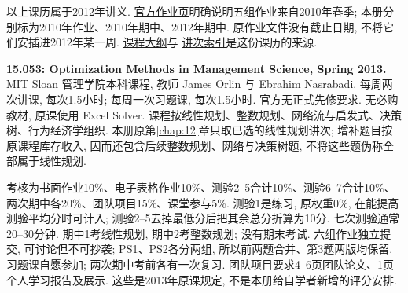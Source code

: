 以上课历属于2012年讲义. \href{https://ocw.mit.edu/courses/6-253-convex-analysis-and-optimization-spring-2012/pages/assignments/}{官方作业页}明确说明五组作业来自2010年春季;
本册分别标为2010年作业、2010年期中、2012年期中. 原作业文件没有截止日期, 不将它们安插进2012年某一周.
\href{https://ocw.mit.edu/courses/6-253-convex-analysis-and-optimization-spring-2012/pages/syllabus/}{课程大纲}与
\href{https://ocw.mit.edu/courses/6-253-convex-analysis-and-optimization-spring-2012/pages/lecture-notes/}{讲次索引}是这份课历的来源.

\clearpage
\noindent\textbf{15.053: Optimization Methods in Management Science, Spring 2013.}
MIT Sloan 管理学院本科课程, 教师 James Orlin 与 Ebrahim Nasrabadi.
每周两次讲课, 每次1.5小时; 每周一次习题课, 每次1.5小时. 官方无正式先修要求.
无必购教材, 原课使用 Excel Solver. 课程按线性规划、整数规划、网络流与启发式、决策树、行为经济学组织.
本册原第\ref{chap:12}章只取已选的线性规划讲次; 增补题目按原课程库存收入, 因而还包含后续整数规划、网络与决策树题, 不将这些题伪称全部属于线性规划.

考核为书面作业10\%、电子表格作业10\%、测验2--5合计10\%、测验6--7合计10\%、两次期中各20\%、团队项目15\%、课堂参与5\%.
测验1是练习, 原权重0\%, 在能提高测验平均分时可计入; 测验2--5去掉最低分后把其余总分折算为10分.
七次测验通常20--30分钟. 期中1考线性规划, 期中2考整数规划; 没有期末考试.
六组作业独立提交, 可讨论但不可抄袭; PS1、PS2各分两组, 所以前两题合并、第3题两版均保留.
习题课自愿参加; 两次期中考前各有一次复习. 团队项目要求4--6页团队论文、1页个人学习报告及展示.
这些是2013年原课规定, 不是本册给自学者新增的评分安排.

